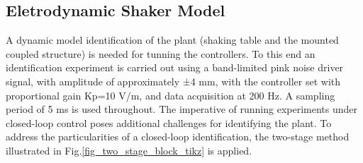 \documentclass[ 10pt, twocolumn]{article} %
\begin{document}






\subsection{Eletrodynamic Shaker Model}

A dynamic model identification of the plant (shaking table and the mounted coupled structure) is needed for tunning the controllers. To this end an identification experiment is carried out using a band-limited pink noise driver signal, with amplitude of approximately ±4 mm, with the controller set with proportional gain Kp=10 V/m, and data acquisition at 200 Hz. A sampling period of 5 ms is used throughout. The imperative of running experiments under closed-loop control poses additional challenges for identifying the plant. To address the particularities of a closed-loop identification, the two-stage method \cite{vandenhof1993} illustrated in Fig.\ref{fig_two_stage_block_tikz} is applied. 
\end{document}
